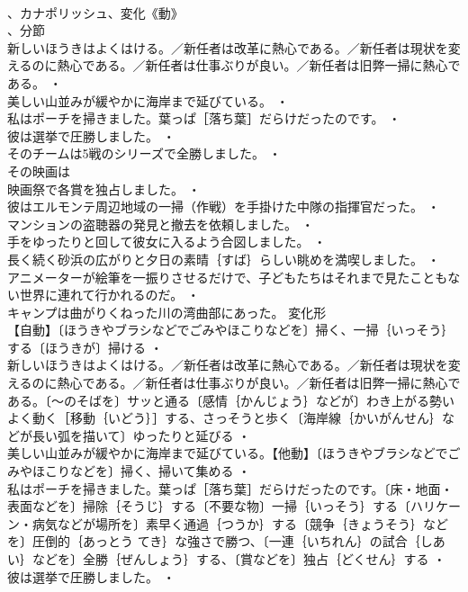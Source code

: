 \documentclass[8pt]{extreport}
\begin{document}
\begin{CJK}{UTF8}{min}
\\	、カナポリッシュ、変化《動》
\\	、分節
\\	新しいほうきはよくはける。／新任者は改革に熱心である。／新任者は現状を変えるのに熱心である。／新任者は仕事ぶりが良い。／新任者は旧弊一掃に熱心である。 ・
\\	美しい山並みが緩やかに海岸まで延びている。 ・
\\	私はポーチを掃きました。葉っぱ［落ち葉］だらけだったのです。 ・
\\	彼は選挙で圧勝しました。 ・
\\	そのチームは5戦のシリーズで全勝しました。 ・
\\	その映画は
\\	映画祭で各賞を独占しました。 ・
\\	彼はエルモンテ周辺地域の一掃（作戦）を手掛けた中隊の指揮官だった。 ・
\\	マンションの盗聴器の発見と撤去を依頼しました。 ・
\\	手をゆったりと回して彼女に入るよう合図しました。 ・
\\	長く続く砂浜の広がりと夕日の素晴｛すば｝らしい眺めを満喫しました。 ・
\\	アニメーターが絵筆を一振りさせるだけで、子どもたちはそれまで見たこともない世界に連れて行かれるのだ。 ・
\\	キャンプは曲がりくねった川の湾曲部にあった。	変化形 
\\	【自動】〔ほうきやブラシなどでごみやほこりなどを〕掃く、一掃｛いっそう｝する〔ほうきが〕掃ける ・
\\	新しいほうきはよくはける。／新任者は改革に熱心である。／新任者は現状を変えるのに熱心である。／新任者は仕事ぶりが良い。／新任者は旧弊一掃に熱心である。〔～のそばを〕サッと通る〔感情｛かんじょう｝などが〕わき上がる勢いよく動く［移動｛いどう｝］する、さっそうと歩く〔海岸線｛かいがんせん｝などが長い弧を描いて〕ゆったりと延びる ・
\\	美しい山並みが緩やかに海岸まで延びている。【他動】〔ほうきやブラシなどでごみやほこりなどを〕掃く、掃いて集める ・
\\	私はポーチを掃きました。葉っぱ［落ち葉］だらけだったのです。〔床・地面・表面などを〕掃除｛そうじ｝する〔不要な物〕一掃｛いっそう｝する〔ハリケーン・病気などが場所を〕素早く通過｛つうか｝する〔競争｛きょうそう｝などを〕圧倒的｛あっとう てき｝な強さで勝つ、〔一連｛いちれん｝の試合｛しあい｝などを〕全勝｛ぜんしょう｝する、〔賞などを〕独占｛どくせん｝する ・
\\	彼は選挙で圧勝しました。 ・

\end{CJK}
\end{document}
